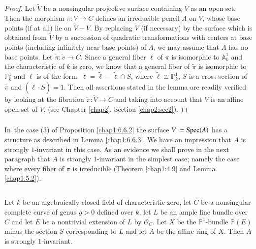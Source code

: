 \begin{proof}
Let $\widetilde{V}$ be a nonsingular projective surface containing $V$
as an open set. Then the morphism $\pi:V\to C$ defines an irreducible
pencil $\Lambda$ on $\widetilde{V}$, whose base points (if at all) lie
on $\widetilde{V}-V$. By replacing $\widetilde{V}$ (if necessary) by
the surface which is obtained from $\widetilde{V}$ by a succession of
quadratic transformations with centers at base points (including
infinitely near base points) of $\Lambda$, we may assume that
$\Lambda$ has no base points. Let $\widetilde{\pi}:\widetilde{v} \to C 
$. Since a general fiber $\ell$ of $\pi$ is isomorphic to
$\mathbb{A}^{1}_{k}$ and the characteristic of $k$ is zero, we know
that a general fiber of $\widetilde{\pi}$ is isomorphic to
$\mathbb{P}^{1}_{k}$ and $\ell$ is of the form:
$\ell=\widetilde{\ell}-\widetilde{\ell}\cap S$, where
$\widetilde{\ell}\cong \mathbb{P}^{1}_{k}$, $S$ is a cross-section of
$\widetilde{\pi}$ and $(\widetilde{\ell}\cdot S)=1$. Then all
assertions stated in the lemma are readily verified by looking at the
fibration $\widetilde{\pi}:\widetilde{V}\to C$ and taking into account
that $V$ is an affine open set of $\widetilde{V}$, (see Chapter \ref{chap2},
Section \ref{chap2:sec2}).
\end{proof}

\subsubsection{}\label{chap1:6.6.4}
In\pageoriginale\ the case (3) of Proposition \ref{chap1:6.6.2} the
surface $V:=\operatorname{Spec}(A)$ has a structure as described in Lemma
\ref{chap1:6.6.3}. We have an impression that $A$ is strongly
$1$-invariant in this case. As an evidence we shall prove in the next
paragraph that $A$ is strongly $1$-invariant in the simplest case;
namely the case where every fiber of $\pi$ is irreducible (\cf Theorem
\ref{chap1:4.9} and Lemma \ref{chap1:5.2}).


\subsection{}\label{chap1:6.7}
\begin{prop*}
Let $k$ be an algebraically closed field of characteristic zero, let
$C$ be a nonsingular complete curve of genus $g>0$ defined over $k$,
let $L$ be an ample line bundle over $C$ and let $E$ be a nontrivial
extension of $L$ by $\mathscr{O}_{C}$. Let $X$ be the
$\mathbb{P}^{1}$-bundle $\mathbb{P}(E)$ minus the section $S$
corresponding to $L$ and let $A$ be the affine ring of $X$. Then $A$
is strongly $1$-invariant.
\end{prop*}


